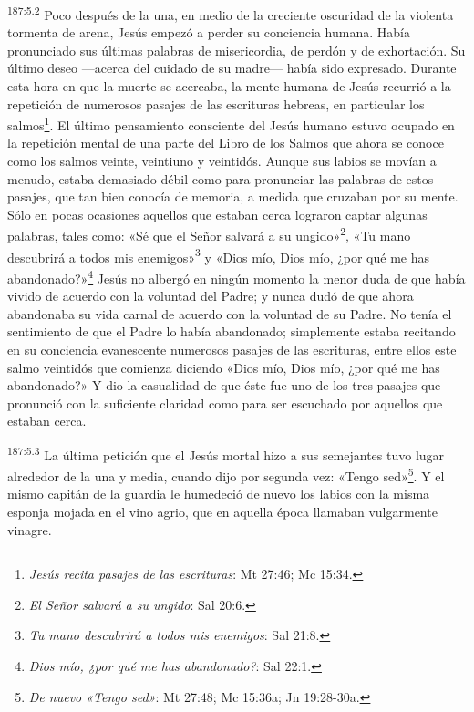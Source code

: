\par
\textsuperscript{187:5.2} Poco después de la una, en medio de la creciente oscuridad de la violenta tormenta de arena, Jesús empezó a perder su conciencia humana. Había pronunciado sus últimas palabras de misericordia, de perdón y de exhortación. Su último deseo ---acerca del cuidado de su madre--- había sido expresado. Durante esta hora en que la muerte se acercaba, la mente humana de Jesús recurrió a la repetición de numerosos pasajes de las escrituras hebreas, en particular los salmos\footnote{\textit{Jesús recita pasajes de las escrituras}: Mt 27:46; Mc 15:34.}. El último pensamiento consciente del Jesús humano estuvo ocupado en la repetición mental de una parte del Libro de los Salmos que ahora se conoce como los salmos veinte, veintiuno y veintidós. Aunque sus labios se movían a menudo, estaba demasiado débil como para pronunciar las palabras de estos pasajes, que tan bien conocía de memoria, a medida que cruzaban por su mente. Sólo en pocas ocasiones aquellos que estaban cerca lograron captar algunas palabras, tales como: «Sé que el Señor salvará a su ungido»\footnote{\textit{El Señor salvará a su ungido}: Sal 20:6.}, «Tu mano descubrirá a todos mis enemigos»\footnote{\textit{Tu mano descubrirá a todos mis enemigos}: Sal 21:8.} y «Dios mío, Dios mío, ¿por qué me has abandonado?»\footnote{\textit{Dios mío, ¿por qué me has abandonado?}: Sal 22:1.} Jesús no albergó en ningún momento la menor duda de que había vivido de acuerdo con la voluntad del Padre; y nunca dudó de que ahora abandonaba su vida carnal de acuerdo con la voluntad de su Padre. No tenía el sentimiento de que el Padre lo había abandonado; simplemente estaba recitando en su conciencia evanescente numerosos pasajes de las escrituras, entre ellos este salmo veintidós que comienza diciendo «Dios mío, Dios mío, ¿por qué me has abandonado?» Y dio la casualidad de que éste fue uno de los tres pasajes que pronunció con la suficiente claridad como para ser escuchado por aquellos que estaban cerca.

\par
\textsuperscript{187:5.3} La última petición que el Jesús mortal hizo a sus semejantes tuvo lugar alrededor de la una y media, cuando dijo por segunda vez: «Tengo sed»\footnote{\textit{De nuevo «Tengo sed»}: Mt 27:48; Mc 15:36a; Jn 19:28-30a.}. Y el mismo capitán de la guardia le humedeció de nuevo los labios con la misma esponja mojada en el vino agrio, que en aquella época llamaban vulgarmente vinagre.

